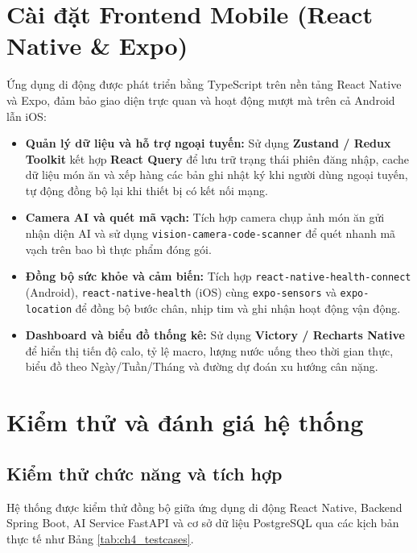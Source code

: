 \documentclass[../main.tex]{subfiles}
\begin{document}
\section{Cài đặt Frontend Mobile (React Native \& Expo)}
\label{sec:4.4}

Ứng dụng di động được phát triển bằng TypeScript trên nền tảng React Native và Expo, đảm bảo giao diện trực quan và hoạt động mượt mà trên cả Android lẫn iOS:
\begin{itemize}
    \item \textbf{Quản lý dữ liệu và hỗ trợ ngoại tuyến:} Sử dụng \textbf{Zustand / Redux Toolkit} kết hợp \textbf{React Query} để lưu trữ trạng thái phiên đăng nhập, cache dữ liệu món ăn và xếp hàng các bản ghi nhật ký khi người dùng ngoại tuyến, tự động đồng bộ lại khi thiết bị có kết nối mạng.
    \item \textbf{Camera AI và quét mã vạch:} Tích hợp camera chụp ảnh món ăn gửi nhận diện AI và sử dụng \texttt{vision-camera-code-scanner} để quét nhanh mã vạch trên bao bì thực phẩm đóng gói.
    \item \textbf{Đồng bộ sức khỏe và cảm biến:} Tích hợp \texttt{react-native-health-connect} (Android), \texttt{react-native-health} (iOS) cùng \texttt{expo-sensors} và \texttt{expo-location} để đồng bộ bước chân, nhịp tim và ghi nhận hoạt động vận động.
    \item \textbf{Dashboard và biểu đồ thống kê:} Sử dụng \textbf{Victory / Recharts Native} để hiển thị tiến độ calo, tỷ lệ macro, lượng nước uống theo thời gian thực, biểu đồ theo Ngày/Tuần/Tháng và đường dự đoán xu hướng cân nặng.
\end{itemize}

\section{Kiểm thử và đánh giá hệ thống}
\label{sec:4.5}

\subsection{Kiểm thử chức năng và tích hợp}

Hệ thống được kiểm thử đồng bộ giữa ứng dụng di động React Native, Backend Spring Boot, AI Service FastAPI và cơ sở dữ liệu PostgreSQL qua các kịch bản thực tế như Bảng \ref{tab:ch4_testcases}.
\end{document}
